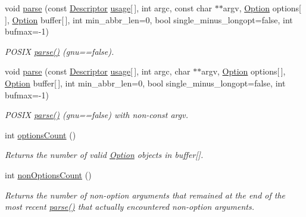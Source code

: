 \begin{DoxyCompactItemize}
void \hyperlink{class_option_parser_1_1_parser_a8cf9bff7f638fb4c48569cd2ef38b78b}{parse} (const \hyperlink{struct_option_parser_1_1_descriptor}{Descriptor} \hyperlink{_community_detection_8cpp_ae4e685e845abde182eb8fc1f87b756ae}{usage}\mbox{[}$\,$\mbox{]}, int argc, const char $\ast$$\ast$argv, \hyperlink{class_option_parser_1_1_option}{Option} options\mbox{[}$\,$\mbox{]}, \hyperlink{class_option_parser_1_1_option}{Option} buffer\mbox{[}$\,$\mbox{]}, int min\-\_\-abbr\-\_\-len=0, bool single\-\_\-minus\-\_\-longopt=false, int bufmax=-\/1)
\begin{DoxyCompactList}\small\item\em P\-O\-S\-I\-X \hyperlink{class_option_parser_1_1_parser_adbde29c0025d0ec88f8b41a656ab45a1}{parse()} (gnu==false). \end{DoxyCompactList}\item 
void \hyperlink{class_option_parser_1_1_parser_a3a5ed99c44d5d02191bb48465036870b}{parse} (const \hyperlink{struct_option_parser_1_1_descriptor}{Descriptor} \hyperlink{_community_detection_8cpp_ae4e685e845abde182eb8fc1f87b756ae}{usage}\mbox{[}$\,$\mbox{]}, int argc, char $\ast$$\ast$argv, \hyperlink{class_option_parser_1_1_option}{Option} options\mbox{[}$\,$\mbox{]}, \hyperlink{class_option_parser_1_1_option}{Option} buffer\mbox{[}$\,$\mbox{]}, int min\-\_\-abbr\-\_\-len=0, bool single\-\_\-minus\-\_\-longopt=false, int bufmax=-\/1)
\begin{DoxyCompactList}\small\item\em P\-O\-S\-I\-X \hyperlink{class_option_parser_1_1_parser_adbde29c0025d0ec88f8b41a656ab45a1}{parse()} (gnu==false) with non-\/const argv. \end{DoxyCompactList}\item 
int \hyperlink{class_option_parser_1_1_parser_aa55e79ff2a3d08e449762aee76991222}{options\-Count} ()
\begin{DoxyCompactList}\small\item\em Returns the number of valid \hyperlink{class_option_parser_1_1_option}{Option} objects in {\ttfamily buffer}\mbox{[}\mbox{]}. \end{DoxyCompactList}\item 
int \hyperlink{class_option_parser_1_1_parser_a9cf3ea6206b3d832ef6cbc335e3b58e6}{non\-Options\-Count} ()
\begin{DoxyCompactList}\small\item\em Returns the number of non-\/option arguments that remained at the end of the most recent \hyperlink{class_option_parser_1_1_parser_adbde29c0025d0ec88f8b41a656ab45a1}{parse()} that actually encountered non-\/option arguments. \end{DoxyCompactList}\item 

\end{DoxyCompactItemize}
